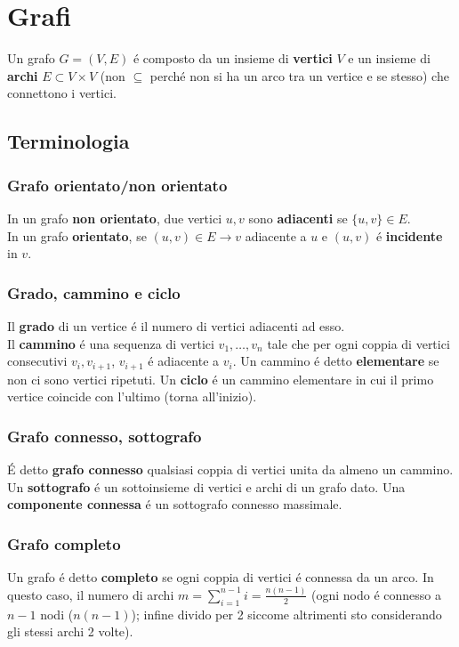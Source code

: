 \documentclass{article}
\begin{document}
\section{Grafi}
Un grafo $G = (V,E)$ é composto da un insieme di \textbf{vertici} $V$ e un insieme di \textbf{archi} $E \subset V \times V$ (non $\subseteq$ perché non si ha un arco tra un vertice e se stesso) che connettono i vertici.

\subsection{Terminologia}

\subsubsection{Grafo orientato/non orientato}
In un grafo \textbf{non orientato}, due vertici $u,v$ sono \textbf{adiacenti} se $\{u,v\} \in E$.\\
In un grafo \textbf{orientato}, se $(u,v) \in E \rightarrow v$ adiacente a $u$ e $(u,v)$ é \textbf{incidente} in $v$.

\subsubsection{Grado, cammino e ciclo}
Il \textbf{grado} di un vertice é il numero di vertici adiacenti ad esso.\\
Il \textbf{cammino} é una sequenza di vertici $v_1, \dots, v_n$ tale che per ogni coppia di vertici consecutivi $v_i, v_{i+1}$, $v_{i+1}$ é adiacente a $v_i$. Un cammino é detto \textbf{elementare} se non ci sono vertici ripetuti. Un \textbf{ciclo} é un cammino elementare in cui il primo vertice coincide con l'ultimo (torna all'inizio).

\subsubsection{Grafo connesso, sottografo}
É detto \textbf{grafo connesso} qualsiasi coppia di vertici unita da almeno un cammino.\\
Un \textbf{sottografo} é un sottoinsieme di vertici e archi di un grafo dato. Una \textbf{componente connessa} é un sottografo connesso massimale.

\subsubsection{Grafo completo}
Un grafo é detto \textbf{completo} se ogni coppia di vertici é connessa da un arco. In questo caso, il numero di archi $m = \sum_{i=1}^{n-1}i = \frac{n(n-1)}{2}$ (ogni nodo é connesso a $n-1$ nodi ($n(n-1)$); infine divido per 2 siccome altrimenti sto considerando gli stessi archi 2 volte).
\end{document}
